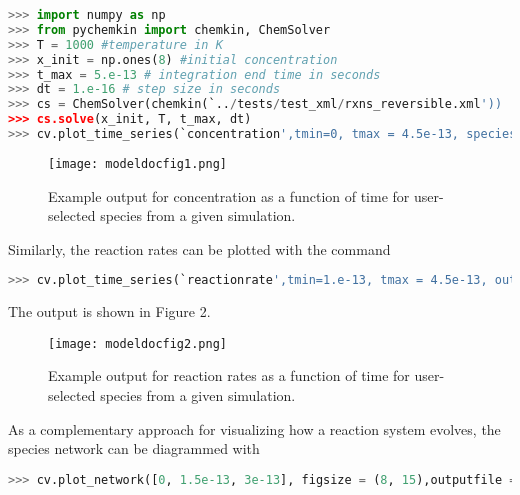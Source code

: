 \documentclass[12pt]{article}
\begin{document}
\begin{lstlisting}[language = Python, basicstyle = \ttfamily,columns = fullflexible, showstringspaces = False]
>>> import numpy as np
>>> from pychemkin import chemkin, ChemSolver
>>> T = 1000 #temperature in K
>>> x_init = np.ones(8) #initial concentration
>>> t_max = 5.e-13 # integration end time in seconds
>>> dt = 1.e-16 # step size in seconds
>>> cs = ChemSolver(chemkin(`../tests/test_xml/rxns_reversible.xml'))
>>> cs.solve(x_init, T, t_max, dt)
>>> cv.plot_time_series(`concentration',tmin=0, tmax = 4.5e-13, species = [`H', `OH', `O2', `H2O'],outputfile = `modeldocfig1.png')
\end{lstlisting}

\begin{figure}[h!]
  \caption{Example output for concentration as a function of time for user-selected species from a given simulation.}
  \centering
  \texttt{[image: modeldocfig1.png]}
\end{figure}

Similarly, the reaction rates can be plotted with the command \\

\begin{lstlisting}[language = Python, basicstyle = \ttfamily,columns = fullflexible, showstringspaces = False]
>>> cv.plot_time_series(`reactionrate',tmin=1.e-13, tmax = 4.5e-13, outputfile = `modeldocfig2.png')
\end{lstlisting}
The output is shown in Figure 2. 




\begin{figure}[h!]
  \caption{Example output for reaction rates as a function of time for user-selected species from a given simulation.}
  \centering
  \texttt{[image: modeldocfig2.png]}
\end{figure}

As a complementary approach for visualizing how a reaction system evolves, the species network can be diagrammed with 
\begin{lstlisting}[language = Python, basicstyle = \ttfamily,columns = fullflexible, showstringspaces = False]
>>> cv.plot_network([0, 1.5e-13, 3e-13], figsize = (8, 15),outputfile = `modeldocfig3.png')

\end{lstlisting}
\end{document}
